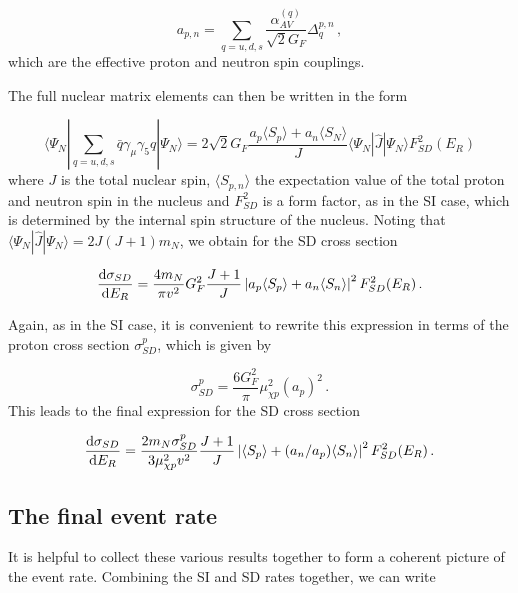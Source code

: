 \begin{equation}
a_{p,n} = \sum_{q = u,d,s} \frac{\alpha_{AV}^{(q)}}{\sqrt{2}G_F} \Delta_q^{p,n}\,,
\end{equation}
which are the effective proton and neutron spin couplings.

The full nuclear matrix elements can then be written in the form 

\begin{equation}
\langle \Psi_N | \sum_{q=u,d,s} \bar{q} \gamma_\mu \gamma_5 q | \Psi_N \rangle = 2 \sqrt{2} G_F \frac{a_p \langle S_p \rangle + a_n \langle S_N \rangle}{J} \langle \Psi_N | \hat{J} | \Psi_N \rangle F_{SD}^2(E_R)
\end{equation}
where $J$ is the total nuclear spin, $\langle S_{p,n} \rangle$ the expectation value of the total proton and neutron spin in the nucleus and $F_{SD}^2$ is a form factor, as in the SI case, which is determined by the internal spin structure of the nucleus. Noting that $\langle \Psi_N | \hat{J} | \Psi_N \rangle = 2J(J+1)m_N$, we obtain for the SD cross section

\begin{equation}
\frac{\mathrm{d}\sigma_{SD}}{\mathrm{d}E_R} = \frac{4 m_N}{\pi v^2} G_F^2 \frac{J + 1}{J} \left| a_p \langle S_p \rangle + a_n \langle S_n \rangle \right|^2 F_{SD}^2(E_R)\,.
\end{equation}

Again, as in the SI case, it is convenient to rewrite this expression in terms of the proton cross section $\sigma_{SD}^p$, which is given by %

\begin{equation}
\sigma_{SD}^{p} = \frac{6 G_F^2}{\pi} \mu_{\chi p}^2 (a_p)^2\,.
\end{equation}
This leads to the final expression for the SD cross section

\begin{equation}
\label{DD:eq:sigsd}
\frac{\mathrm{d}\sigma_{SD}}{\mathrm{d}E_R} = \frac{2 m_N \sigma_{SD}^p}{3 \mu_{\chi p}^2 v^2} \frac{J+1}{J} \left| \langle S_p \rangle + (a_n/a_p) \langle S_n \rangle \right|^2 F_{SD}^2(E_R)\,.
\end{equation}

\subsection{The final event rate}
\label{sec:DD:finalrate}
It is helpful to collect these various results together to form a coherent picture of the event rate. Combining the SI and SD rates together, we can write

